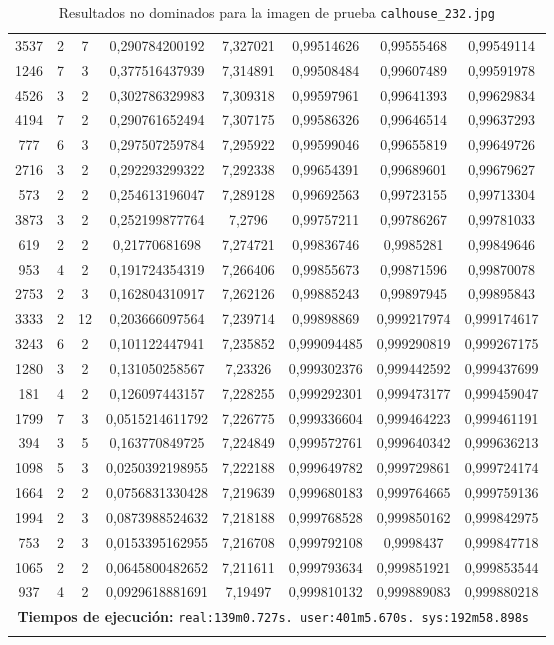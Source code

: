 \begin{longtable}{|c|c|c|c|c|c|c|c|}
3537 & 2 & 7 & 0,290784200192 & 7,327021 & 0,99514626 & 0,99555468 & 0,99549114 \\
1246 & 7 & 3 & 0,377516437939 & 7,314891 & 0,99508484 & 0,99607489 & 0,99591978 \\
4526 & 3 & 2 & 0,302786329983 & 7,309318 & 0,99597961 & 0,99641393 & 0,99629834 \\
4194 & 7 & 2 & 0,290761652494 & 7,307175 & 0,99586326 & 0,99646514 & 0,99637293 \\
777 & 6 & 3 & 0,297507259784 & 7,295922 & 0,99599046 & 0,99655819 & 0,99649726 \\
2716 & 3 & 2 & 0,292293299322 & 7,292338 & 0,99654391 & 0,99689601 & 0,99679627 \\
573 & 2 & 2 & 0,254613196047 & 7,289128 & 0,99692563 & 0,99723155 & 0,99713304 \\
3873 & 3 & 2 & 0,252199877764 & 7,2796 & 0,99757211 & 0,99786267 & 0,99781033 \\
619 & 2 & 2 & 0,21770681698 & 7,274721 & 0,99836746 & 0,9985281 & 0,99849646 \\
953 & 4 & 2 & 0,191724354319 & 7,266406 & 0,99855673 & 0,99871596 & 0,99870078 \\
2753 & 2 & 3 & 0,162804310917 & 7,262126 & 0,99885243 & 0,99897945 & 0,99895843 \\
3333 & 2 & 12 & 0,203666097564 & 7,239714 & 0,99898869 & 0,999217974 & 0,999174617 \\
3243 & 6 & 2 & 0,101122447941 & 7,235852 & 0,999094485 & 0,999290819 & 0,999267175 \\
1280 & 3 & 2 & 0,131050258567 & 7,23326 & 0,999302376 & 0,999442592 & 0,999437699 \\
181 & 4 & 2 & 0,126097443157 & 7,228255 & 0,999292301 & 0,999473177 & 0,999459047 \\
1799 & 7 & 3 & 0,0515214611792 & 7,226775 & 0,999336604 & 0,999464223 & 0,999461191 \\
394 & 3 & 5 & 0,163770849725 & 7,224849 & 0,999572761 & 0,999640342 & 0,999636213 \\
1098 & 5 & 3 & 0,0250392198955 & 7,222188 & 0,999649782 & 0,999729861 & 0,999724174 \\
1664 & 2 & 2 & 0,0756831330428 & 7,219639 & 0,999680183 & 0,999764665 & 0,999759136 \\
1994 & 2 & 3 & 0,0873988524632 & 7,218188 & 0,999768528 & 0,999850162 & 0,999842975 \\
753 & 2 & 3 & 0,0153395162955 & 7,216708 & 0,999792108 & 0,9998437 & 0,999847718 \\
1065 & 2 & 2 & 0,0645800482652 & 7,211611 & 0,999793634 & 0,999851921 & 0,999853544 \\
937 & 4 & 2 & 0,0929618881691 & 7,19497 & 0,999810132 & 0,999889083 & 0,999880218 \\
\hline
\multicolumn{8}{|c|}{\textbf{Tiempos de ejecución:} \texttt{real:139m0.727s. user:401m5.670s. sys:192m58.898s
}}\\ \hline
\caption{Resultados no dominados para la imagen de prueba \texttt{calhouse\_232.jpg}}
\label{tab:calhouse_232}
\end{longtable}
\normalsize


